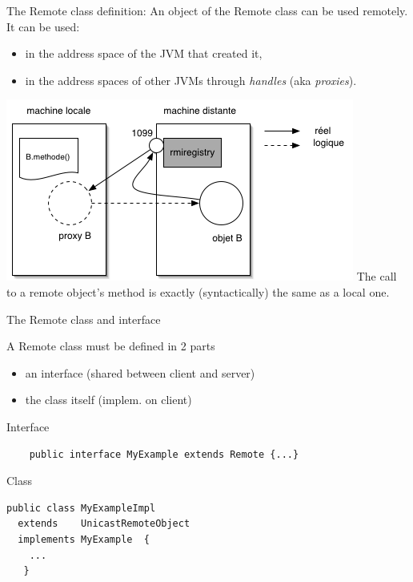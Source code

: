 \documentclass[bigger,hyperref={colorlinks=true, urlcolor=red, plainpages=false, pdfpagelabels, bookmarksnumbered}]{beamer}
\begin{document}
\begin{frame}[label=sec-3-3]{The Remote class}
definition: An object of the Remote class can be used remotely.
It can be used:
\begin{itemize}
\item in the address space of the JVM that created it,
\item in the address spaces of other JVMs through \emph{handles} (aka \emph{proxies}).
\end{itemize}

\includegraphics[width=.9\linewidth]{../img/proxy.png}
The call to a remote object's method is exactly (syntactically) the same as a local one.   
\end{frame}

\begin{frame}[fragile,label=sec-3-4]{The Remote class  and interface}
 \begin{block}{A Remote class must be defined in 2 parts}
\begin{itemize}
\item an interface (shared between client and server)
\item the class itself (implem. on client)
\end{itemize}
\end{block}
\begin{block}{Interface}
\lstset{language=java,label= ,caption= ,numbers=none}
\begin{lstlisting}
    public interface MyExample extends Remote {...}
\end{lstlisting}
\end{block}

\begin{block}{Class}
\lstset{language=java,label= ,caption= ,numbers=none}
\begin{lstlisting}
public class MyExampleImpl 
  extends    UnicastRemoteObject
  implements MyExample  {
    ...
   }
\end{lstlisting}
\end{block}
\end{frame}
\end{document}
